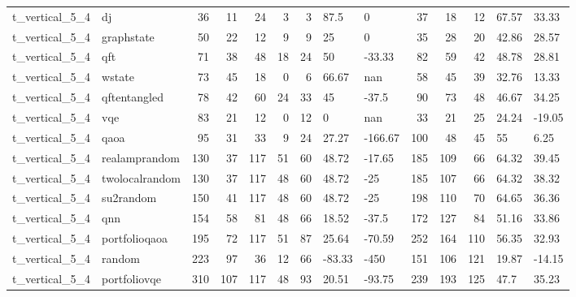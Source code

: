 \begin{longtable}{llrrrrrllrrrll}
t\_vertical\_5\_4 & dj & 36 & 11 & 24 & 3 & 3 & 87.5 & 0 & 37 & 18 & 12 & 67.57 & 33.33 \\
t\_vertical\_5\_4 & graphstate & 50 & 22 & 12 & 9 & 9 & 25 & 0 & 35 & 28 & 20 & 42.86 & 28.57 \\
t\_vertical\_5\_4 & qft & 71 & 38 & 48 & 18 & 24 & 50 & -33.33 & 82 & 59 & 42 & 48.78 & 28.81 \\
t\_vertical\_5\_4 & wstate & 73 & 45 & 18 & 0 & 6 & 66.67 & nan & 58 & 45 & 39 & 32.76 & 13.33 \\
t\_vertical\_5\_4 & qftentangled & 78 & 42 & 60 & 24 & 33 & 45 & -37.5 & 90 & 73 & 48 & 46.67 & 34.25 \\
t\_vertical\_5\_4 & vqe & 83 & 21 & 12 & 0 & 12 & 0 & nan & 33 & 21 & 25 & 24.24 & -19.05 \\
t\_vertical\_5\_4 & qaoa & 95 & 31 & 33 & 9 & 24 & 27.27 & -166.67 & 100 & 48 & 45 & 55 & 6.25 \\
t\_vertical\_5\_4 & realamprandom & 130 & 37 & 117 & 51 & 60 & 48.72 & -17.65 & 185 & 109 & 66 & 64.32 & 39.45 \\
t\_vertical\_5\_4 & twolocalrandom & 130 & 37 & 117 & 48 & 60 & 48.72 & -25 & 185 & 107 & 66 & 64.32 & 38.32 \\
t\_vertical\_5\_4 & su2random & 150 & 41 & 117 & 48 & 60 & 48.72 & -25 & 198 & 110 & 70 & 64.65 & 36.36 \\
t\_vertical\_5\_4 & qnn & 154 & 58 & 81 & 48 & 66 & 18.52 & -37.5 & 172 & 127 & 84 & 51.16 & 33.86 \\
t\_vertical\_5\_4 & portfolioqaoa & 195 & 72 & 117 & 51 & 87 & 25.64 & -70.59 & 252 & 164 & 110 & 56.35 & 32.93 \\
t\_vertical\_5\_4 & random & 223 & 97 & 36 & 12 & 66 & -83.33 & -450 & 151 & 106 & 121 & 19.87 & -14.15 \\
t\_vertical\_5\_4 & portfoliovqe & 310 & 107 & 117 & 48 & 93 & 20.51 & -93.75 & 239 & 193 & 125 & 47.7 & 35.23 \\
\end{longtable}
